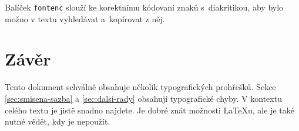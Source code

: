 \documentclass[twocolumn,a4paper,10pt,final]{article}
\begin{document}
	
	Balíček \texttt{fontenc} slouží ke korektnímu kódovaní znaků s~diakritikou, aby bylo možno v textu vyhledávat a~kopírovat z něj.
	\section{Závěr}\label{sec:zaver}
	Tento dokument schválně obsahuje několik typografických prohřešků.
	Sekce \ref{sec:smisena-sazba} a \ref{sec:dalsi-rady} obsahují typografické chyby.
	V kontextu celého textu je jistě snadno najdete.
	Je dobré znát možnosti \LaTeX u, ale je také nutné vědět, kdy je nepoužít.
\end{document}
